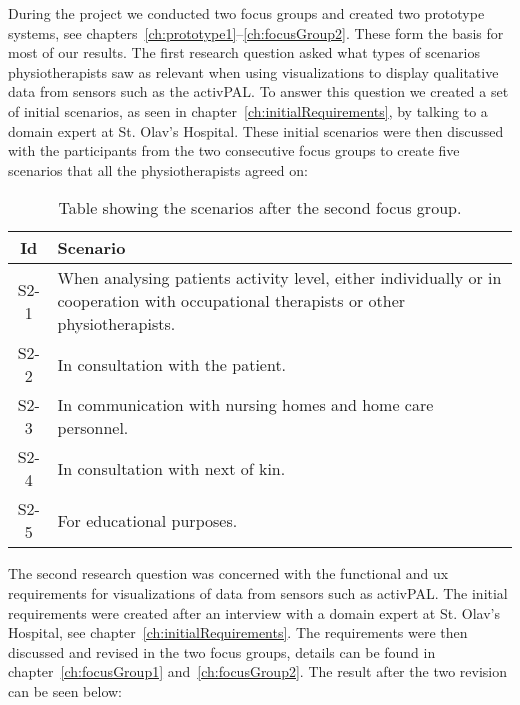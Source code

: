 During the project we conducted two focus groups and created two prototype systems, see chapters~\ref{ch:prototype1}--\ref{ch:focusGroup2}. These form the basis for most of our results. The first research question asked what types of scenarios physiotherapists saw as relevant when using visualizations to display qualitative data from sensors such as the activPAL. To answer this question we created a set of initial scenarios, as seen in chapter~\ref{ch:initialRequirements}, by talking to a domain expert at St. Olav's Hospital. These initial scenarios were then discussed with the participants from the two consecutive focus groups to create five scenarios that all the physiotherapists agreed on:
\begin{table}[h!]
  \begin{tabular}{|c|p{10cm}|}
    \hline
    \textbf{Id} & \textbf{Scenario} \\ \hline
    S2-1 & When analysing patients activity level, either individually or in cooperation with occupational therapists or other physiotherapists. \\ \hline
    S2-2 & In consultation with the patient. \\ \hline
    S2-3 & In communication with nursing homes and home care personnel. \\ \hline
    S2-4 & In consultation with next of kin. \\ \hline
    S2-5 & For educational purposes. \\ \hline
  \end{tabular}
  \caption{Table showing the scenarios after the second focus group.}
\end{table}

The second research question was concerned with the functional and \gls{ux} requirements for visualizations of data from sensors such as activPAL. The initial requirements were created after an interview with a domain expert at St. Olav's Hospital, see chapter~\ref{ch:initialRequirements}. The requirements were then discussed and revised in the two focus groups, details can be found in chapter~\ref{ch:focusGroup1} and~\ref{ch:focusGroup2}. The result after the two revision can be seen below:

